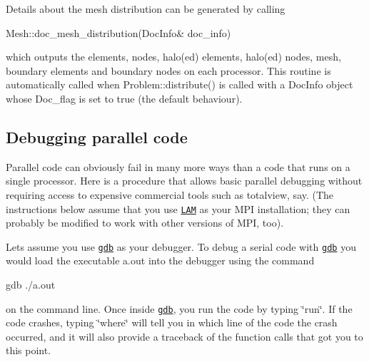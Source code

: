 Details about the mesh distribution can be generated by calling 
\begin{DoxyCode}
Mesh::doc\_mesh\_distribution(DocInfo& doc\_info)
\end{DoxyCode}
 which outputs the elements, nodes, halo(ed) elements, halo(ed) nodes, mesh, boundary elements and boundary nodes on each processor. This routine is automatically called when {\ttfamily Problem\+::distribute()} is called with a {\ttfamily Doc\+Info} object whose {\ttfamily Doc\+\_\+flag} is set to true (the default behaviour).



\hypertarget{index_parallel_debug}{}\subsection{Debugging parallel code}\label{index_parallel_debug}
Parallel code can obviously fail in many more ways than a code that runs on a single processor. Here is a procedure that allows basic parallel debugging without requiring access to expensive commercial tools such as totalview, say. (The instructions below assume that you use \href{http://www.lam-mpi.org/}{\tt L\+AM} as your M\+PI installation; they can probably be modified to work with other versions of M\+PI, too).

Let\textquotesingle{}s assume you use \href{http://www.gnu.org/software/gdb/}{\tt gdb} as your debugger. To debug a serial code with \href{http://www.gnu.org/software/gdb/}{\tt gdb} you would load the executable {\ttfamily a.\+out} into the debugger using the command 
\begin{DoxyCode}
gdb ./a.out
\end{DoxyCode}
 on the command line. Once inside \href{http://www.gnu.org/software/gdb/}{\tt gdb}, you run the code by typing \char`\"{}run\char`\"{}. If the code crashes, typing \char`\"{}where\char`\"{} will tell you in which line of the code the crash occurred, and it will also provide a traceback of the function calls that got you to this point.

